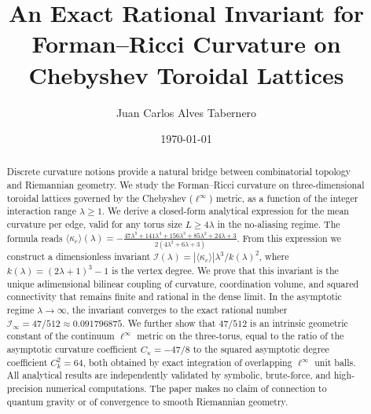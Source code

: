 \documentclass[aps,pre,onecolumn,10pt,groupedaddress,amsmath,amssymb,floatfix]{revtex4-2}
\begin{document}
\title{An Exact Rational Invariant for Forman--Ricci Curvature on Chebyshev Toroidal Lattices}

\author{Juan Carlos Alves Tabernero}

\date{\today}

\begin{abstract}
Discrete curvature notions provide a natural bridge between combinatorial topology and Riemannian geometry. We study the Forman--Ricci curvature on three-dimensional toroidal lattices governed by the Chebyshev ($\ell^\infty$) metric, as a function of the integer interaction range $\lambda \ge 1$. We derive a closed-form analytical expression for the mean curvature per edge, valid for any torus size $L \ge 4\lambda$ in the no-aliasing regime. The formula reads
$\langle\kappa_e\rangle(\lambda) = -\frac{47\lambda^5 + 141\lambda^4 + 156\lambda^3 + 85\lambda^2 + 24\lambda + 3}{2(4\lambda^2 + 6\lambda + 3)}$.
From this expression we construct a dimensionless invariant
$\mathcal{I}(\lambda) = |\langle\kappa_e\rangle| \lambda^3 / k(\lambda)^2$,
where $k(\lambda) = (2\lambda+1)^3 - 1$ is the vertex degree. We prove that this invariant is the unique adimensional bilinear coupling of curvature, coordination volume, and squared connectivity that remains finite and rational in the dense limit. In the asymptotic regime $\lambda \to \infty$, the invariant converges to the exact rational number
$\mathcal{I}_\infty = 47/512 \approx 0.091796875$.
We further show that $47/512$ is an intrinsic geometric constant of the continuum $\ell^\infty$ metric on the three-torus, equal to the ratio of the asymptotic curvature coefficient $C_\kappa = -47/8$ to the squared asymptotic degree coefficient $C_k^2 = 64$, both obtained by exact integration of overlapping $\ell^\infty$ unit balls. All analytical results are independently validated by symbolic, brute-force, and high-precision numerical computations. The paper makes no claim of connection to quantum gravity or of convergence to smooth Riemannian geometry.
\end{abstract}

\maketitle

\end{document}
